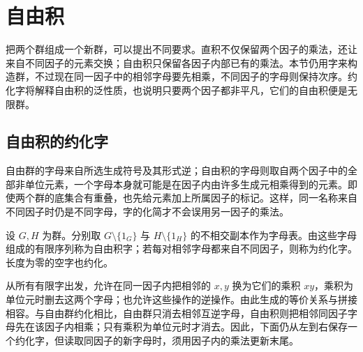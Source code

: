 
\section{自由积}
\label{b1:sec:0803}

把两个群组成一个新群，可以提出不同要求。直积不仅保留两个因子的乘法，还让来自不同因子的元素交换；自由积只保留各因子内部已有的乘法。本节仍用字来构造群，不过现在同一因子中的相邻字母要先相乘，不同因子的字母则保持次序。约化字将解释自由积的泛性质，也说明只要两个因子都非平凡，它们的自由积便是无限群。

%
%

\subsection{自由积的约化字}
\label{b1:subsec:0803:01}

自由群的字母来自所选生成符号及其形式逆；自由积的字母则取自两个因子中的全部非单位元素，一个字母本身就可能是在因子内由许多生成元相乘得到的元素。即使两个群的底集合有重叠，也先给元素加上所属因子的标记。这样，同一名称来自不同因子时仍是不同字母，字的化简才不会误用另一因子的乘法。

\begin{definition}\label{b1:def:free-product-word}
	设 \(G,H\) 为群。分别取 \(G\setminus\{1_G\}\) 与 \(H\setminus\{1_H\}\) 的不相交副本作为字母表。由这些字母组成的有限序列称为自由积字；若每对相邻字母都来自不同因子，则称为约化字。长度为零的空字也约化。
\end{definition}

从所有有限字出发，允许在同一因子内把相邻的 \(x,y\) 换为它们的乘积 \(xy\)，乘积为单位元时删去这两个字母；也允许这些操作的逆操作。由此生成的等价关系与拼接相容。与自由群约化相比，自由群只消去相邻互逆字母，自由积则把相邻同因子字母先在该因子内相乘；只有乘积为单位元时才消去。因此，下面仍从左到右保存一个约化字，但读取同因子的新字母时，须用因子内的乘法更新末尾。

